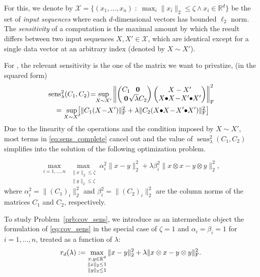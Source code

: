For this, we denote by $\mathcal{X}=\{(x_1,\dots,x_n)\;:\;\max_i \|x_i\|_2\leq \zeta \wedge x_i \in\mathbb{R}^{d}\}$ 
be the set of \emph{input sequences} where each $d$-dimensional vectors has bounded $\ell_2$ norm.
%
The \emph{sensitivity} of a computation is the maximal 
amount by which the result differs between two input 
sequences $X,X'\in\mathcal{X}$, which are identical 
except for a single data vector at an arbitrary 
index (denoted by $X\sim X'$). 

For \acronym, the relevant sensitivity is the 
one of the matrix we want to privatize, \ie (in the squared form)
%
\begin{align}
    &\operatorname{sens}_{\lambda}^2(C_1, C_2)
    \!=\!\! \sup_{X \sim X'} 
    \left\|
    \begingroup
    \setlength{\arraycolsep}{-1pt} %
    \begin{pmatrix}
        C_1 & \textbf{0}\\
        \textbf{0} & \sqrt{\lambda} C_2\\
    \end{pmatrix}\endgroup \begin{pmatrix}
        X - X'\\
        X\face X\!-\!X'\face X'
    \end{pmatrix}\right\|_{\Fr}^2   
    \notag\\
    &\quad =\sup_{X \sim X'}\!\!\! \left[\|C_1(X\!-\!X')\|_{\Fr}^2 +  \lambda \|C_2
    (X\face X\!-\!X'\face X')\|_{\Fr}^2\right]
    \label{eq:sens_complete}
\end{align}
%
Due to the linearity of the operations and the condition imposed by $X\sim X'$, 
most terms in \eqref{eq:sens_complete} cancel out and the value 
of $\operatorname{sens}^2_{\lambda}(C_1,C_2)$ simplifies into 
the solution of the following optimization problem.

\begin{problem}\label{prb:cov_sens}
\begin{equation}
   \max_{i=1, \dots, n} \max_{\substack{\|x\|_2 \le \zeta\\\|y\|_2 \le \zeta}} \alpha^2_i \|x - y\|_2^2 + \lambda \beta^2_i \|x \otimes x - y \otimes y\|_2^2,\label{eq:cov_sens}
\end{equation}
where $\alpha^2_i = \|(C_1)_i\|_2^2$ and $\beta^2_i = \|(C_2)_i\|_2^2$ are the column norms of the matrices $C_1$ and $C_2$, respectively. 
\end{problem}

To study Problem~\ref{prb:cov_sens}, we introduce as an intermediate object the formulation of \eqref{eq:cov_sens} in the special case of $\zeta=1$ and $\alpha_i=\beta_i=1$ for $i=1,\dots,n$, treated as a function of $\lambda$:
\begin{equation}\label{def:r_d_appendix}
    r_d(\lambda) := \max_{\substack{x,y\in\mathbb{R}^d\\\|x\|_2 \le 1\\\|y\|_2 \le 1}} \|x - y\|^2_2 + \lambda \|x \otimes x - y \otimes y\|_{\text{F}}^2.
\end{equation}

